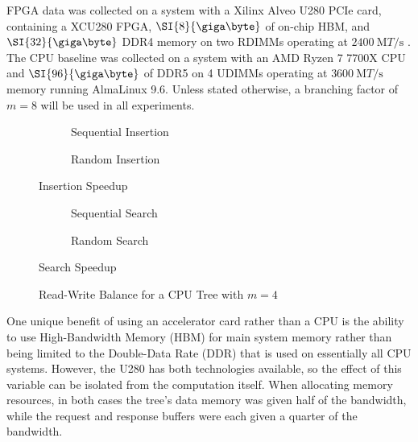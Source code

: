 
FPGA data was collected on a system with a Xilinx Alveo U280 PCIe card,
containing a XCU280 FPGA, $\SI{8}{\giga\byte}$ of on-chip HBM, and
$\SI{32}{\giga\byte}$ DDR4 memory on two RDIMMs operating at
$\SI{2400}{\mega{T}\per\second}$ \autocite{u280}. The CPU baseline was collected
on a system with an AMD Ryzen 7 7700X CPU and $\SI{96}{\giga\byte}$ of DDR5 on 4
UDIMMs operating at $\SI{3600}{\mega{T}\per\second}$ memory running AlmaLinux
9.6.
%
Unless stated otherwise, a branching factor of $m=8$ will be used in all
experiments.




\begin{figure}[H]
	\centering
	\begin{subfigure}{7.5cm}
		\centering
		
		\caption{Sequential Insertion}
		\label{fig:fpga-sequential-insert}
	\end{subfigure}
	\begin{subfigure}{7.5cm}
		\centering
		
		\caption{Random Insertion}
		\label{fig:fpga-random-insert}
	\end{subfigure}
	\caption{Insertion Speedup}
	\label{fig:insert-speedup}
\end{figure}

\begin{figure}[H]
	\centering
	\begin{subfigure}{7.5cm}
		\centering
		
		\caption{Sequential Search}
		\label{fig:fpga-sequential-search}
	\end{subfigure}
	\begin{subfigure}{7.5cm}
		\centering
		
		\caption{Random Search}
		\label{fig:fpga-random-search}
	\end{subfigure}
	\caption{Search Speedup}
	\label{fig:search-speedup}
\end{figure}



\begin{figure}[H]
	\centering
	
	\caption{Read-Write Balance for a CPU Tree with $m=4$}
	\label{fig:rw-balance}
\end{figure}



One unique benefit of using an accelerator card rather than a CPU is the ability
to use High-Bandwidth Memory (HBM) for main system memory rather than being
limited to the Double-Data Rate (DDR) that is used on essentially all CPU
systems. However, the U280 has both technologies available, so the effect of
this variable can be isolated from the computation itself. When allocating
memory resources, in both cases the tree's data memory was given half of the
bandwidth, while the request and response buffers were each given a quarter of
the bandwidth.

